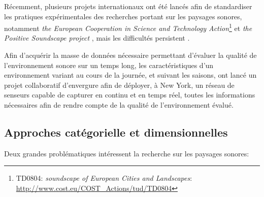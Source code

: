 Récemment, plusieurs projets internationaux ont été lancés afin de standardiser les pratiques expérimentales des recherches portant sur les paysages sonores, notamment \emph{the European Cooperation in Science and Technology Action}\footnote{TD0804: \emph{soundscape of European Cities and Landscapes}: \url{http://www.cost.eu/COST_Actions/tud/TD0804}} \citep{schulte2010soundscape} et \emph{the Positive Soundscape project} \citep{salford2106,davies2013perception}, mais les difficultés persistent \citep{schulte2013soundscape,ribeiro2013heart}. 

Afin d'acquérir la masse de données nécessaire permettant d'évaluer la qualité de l'environnement sonore sur un temps long, les caractéristiques d'un environnement variant au cours de la journée, et suivant les saisons,  \citep{park14} ont lancé un projet collaboratif d'envergure afin de déployer, à New York, un réseau de senseurs capable de capturer en continu et en temps réel, toutes les informations nécessaires afin de rendre compte de la qualité de l’environnement évalué.

\subsection{Approches catégorielle et dimensionnelles}
\label{sec:ch3_appCatDim}

Deux grandes problématiques intéressent la recherche sur les paysages sonores:

